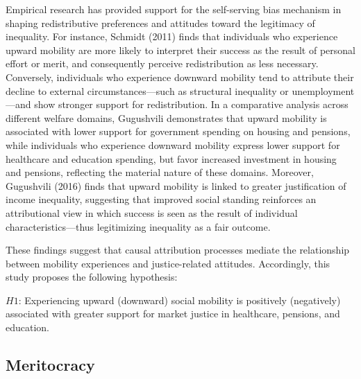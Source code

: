 \documentclass[
  12pt,
]{article}
\begin{document}
Empirical research has provided support for the self-serving bias
mechanism in shaping redistributive preferences and attitudes toward the
legitimacy of inequality. For instance, Schmidt (2011) finds that
individuals who experience upward mobility are more likely to interpret
their success as the result of personal effort or merit, and
consequently perceive redistribution as less necessary. Conversely,
individuals who experience downward mobility tend to attribute their
decline to external circumstances---such as structural inequality or
unemployment---and show stronger support for redistribution. In a
comparative analysis across different welfare domains, Gugushvili
demonstrates that upward mobility is associated with lower support for
government spending on housing and pensions, while individuals who
experience downward mobility express lower support for healthcare and
education spending, but favor increased investment in housing and
pensions, reflecting the material nature of these domains. Moreover,
Gugushvili (2016) finds that upward mobility is linked to greater
justification of income inequality, suggesting that improved social
standing reinforces an attributional view in which success is seen as
the result of individual characteristics---thus legitimizing inequality
as a fair outcome.

These findings suggest that causal attribution processes mediate the
relationship between mobility experiences and justice-related attitudes.
Accordingly, this study proposes the following hypothesis:

\(H1\): Experiencing upward (downward) social mobility is positively
(negatively) associated with greater support for market justice in
healthcare, pensions, and education.

\subsection{Meritocracy}\label{meritocracy}
\end{document}
